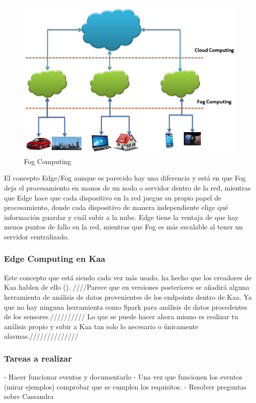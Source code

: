 \documentclass[12pt, twoside]{book}
\newcommand{\MYhref}[3][blue]{\href{#2}{\color{#1}{#3}}}
\begin{document}
\begin{figure}[H]
\centering
\includegraphics[scale=0.6]{images/fog_computing}
\caption{Fog Computing}\label{L509}
\end{figure}

El concepto Edge/Fog aunque es parecido hay una diferencia y está en que Fog deja el procesamiento en manos de un nodo o servidor dentro de la red, mientras que Edge hace que cada dispositivo en la red juegue su propio papel de procesamiento, donde cada dispositivo de manera independiente elige qué información guardar y cuál subir a la nube. Edge tiene la ventaja de que hay menos puntos de fallo en la red, mientras que Fog es más escalable al tener un servidor centralizado.

\subsubsection*{Edge Computing en Kaa}
Este concepto que está siendo cada vez más usado, ha hecho que los creadores de Kaa hablen de ello (\MYhref{https://www.kaaproject.org/edge-analytics-kaa/}{vídeo}). ////Parece que en versiones posteriores se añadirá alguna herramienta de análisis de datos provenientes de los endpoints dentro de Kaa. Ya que no hay ninguna herramienta como Spark para análisis de datos procedentes de los sensores.////////// Lo que se puede hacer ahora mismo es realizar tu análisis propio y subir a Kaa tan solo lo necesario o únicamente alarmas.//////////////
\subsubsection*{Tareas a realizar}
- Hacer funcionar eventos y documentarlo
- Una vez que funcionen los eventos (mirar ejemplos) comprobar que se cumplen los requisitos.
- Resolver preguntas sobre Cassandra
\end{document}
